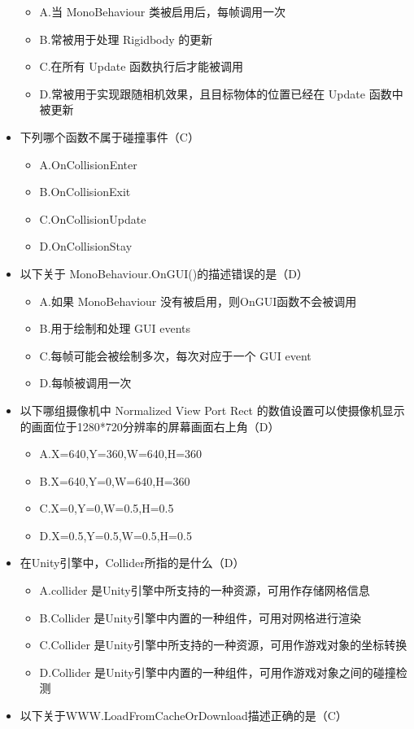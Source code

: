 \documentclass[9pt, b5paper]{article}
\begin{document}
\begin{itemize}
\begin{itemize}
\item A.当 MonoBehaviour 类被启用后，每帧调用一次
\item B.常被用于处理 Rigidbody 的更新
\item C.在所有 Update 函数执行后才能被调用
\item D.常被用于实现跟随相机效果，且目标物体的位置已经在 Update 函数中被更新
\end{itemize}
\item 下列哪个函数不属于碰撞事件（C）
\begin{itemize}
\item A.OnCollisionEnter
\item B.OnCollisionExit
\item C.OnCollisionUpdate
\item D.OnCollisionStay
\end{itemize}
\item 以下关于 MonoBehaviour.OnGUI()的描述错误的是（D）
\begin{itemize}
\item A.如果 MonoBehaviour 没有被启用，则OnGUI函数不会被调用
\item B.用于绘制和处理 GUI events
\item C.每帧可能会被绘制多次，每次对应于一个 GUI event
\item D.每帧被调用一次
\end{itemize}
\item 以下哪组摄像机中 Normalized View Port Rect 的数值设置可以使摄像机显示的画面位于1280*720分辨率的屏幕画面右上角（D）
\begin{itemize}
\item A.X=640,Y=360,W=640,H=360
\item B.X=640,Y=0,W=640,H=360
\item C.X=0,Y=0,W=0.5,H=0.5
\item D.X=0.5,Y=0.5,W=0.5,H=0.5
\end{itemize}
\item 在Unity引擎中，Collider所指的是什么（D）
\begin{itemize}
\item A.collider 是Unity引擎中所支持的一种资源，可用作存储网格信息
\item B.Collider 是Unity引擎中内置的一种组件，可用对网格进行渲染
\item C.Collider 是Unity引擎中所支持的一种资源，可用作游戏对象的坐标转换
\item D.Collider 是Unity引擎中内置的一种组件，可用作游戏对象之间的碰撞检测
\end{itemize}
\item 以下关于WWW.LoadFromCacheOrDownload描述正确的是（C）

\end{itemize}
\end{document}
